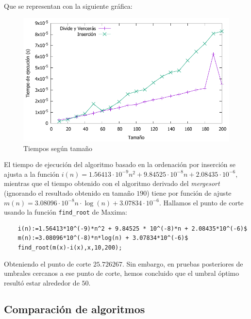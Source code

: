 \pgfplotstabletypeset[
display columns/0/.style={column name=Tamaño},
display columns/1/.style={column name=Inserción},
display columns/2/.style={column name=Mergesort},
]{\prefIns}

\vspace*{1cm}

Que se representan con la siguiente gráfica:

\begin{figure}[H]\includegraphics[width=14cm]{img/umbral_preferencias.pdf} \centering
	\caption{Tiempos según tamaño}
\end{figure}

El tiempo de ejecución del algoritmo basado en la ordenación por inserción se ajusta a la función $i(n) = 1.56413 \cdot 10^{-9} n^2 + 9.84525 \cdot 10^{-8} n + 2.08435 \cdot 10^{-6}$, mientras que el tiempo obtenido con el algoritmo derivado del \textit{mergesort} (ignorando el resultado obtenido en tamaño $190$) tiene por función de ajuste $m(n) = 3.08096 \cdot 10^{-8} n \cdot \log(n) + 3.07834 \cdot 10^{-6}$. Hallamos el punto de corte usando la función \texttt{find\_root} de Maxima: 

\begin{lstlisting}
	i(n):=1.56413*10^(-9)*n^2 + 9.84525 * 10^(-8)*n + 2.08435*10^(-6)$
	m(n):=3.08096*10^(-8)*n*log(n) + 3.07834*10^(-6)$
	find_root(m(x)-i(x),x,10,200);
\end{lstlisting}

Obteniendo el punto de corte $25.726267$. Sin embargo, en pruebas posteriores de umbrales cercanos a ese punto de corte, hemos concluido que el umbral óptimo resultó estar alrededor de $50$.

\subsection{Comparación de algoritmos}

